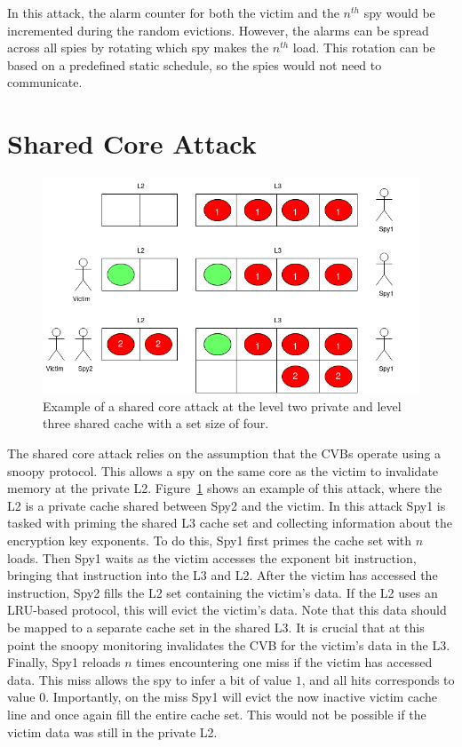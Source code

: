 \documentclass[12pt]{article}
\begin{document}
In this attack, the alarm counter for both the victim and the $n^{th}$ spy would be incremented during the random evictions.
However, the alarms can be spread across all spies by rotating which spy makes the $n^{th}$ load.
This rotation can be based on a predefined static schedule, so the spies would not need to communicate.


\section{Shared Core Attack}

\begin{figure}[h]
\centering
\includegraphics[scale=0.5]{../presentation/snd_atk.png}
\caption{Example of a shared core attack at the level two private and level three shared cache with a set size of four.}
\label{fig:ss}
\end{figure}

The shared core attack relies on the assumption that the CVBs operate using a snoopy protocol.
This allows a spy on the same core as the victim to invalidate memory at the private L2.
Figure~\ref{fig:ss} shows an example of this attack, where the L2 is a private cache shared between Spy2 and the victim.
In this attack Spy1 is tasked with priming the shared L3 cache set and collecting information about the encryption key exponents.
To do this, Spy1 first primes the cache set with $n$ loads.
Then Spy1 waits as the victim accesses the exponent bit instruction, bringing that instruction into the L3 and L2.
After the victim has accessed the instruction, Spy2 fills the L2 set containing the victim's data.
If the L2 uses an LRU-based protocol, this will evict the victim's data.
Note that this data should be mapped to a separate cache set in the shared L3.
It is crucial that at this point the snoopy monitoring invalidates the CVB for the victim's data in the L3.
Finally, Spy1 reloads $n$ times encountering one miss if the victim has accessed data.
This miss allows the spy to infer a bit of value $1$, and all hits corresponds to value $0$.
Importantly, on the miss Spy1 will evict the now inactive victim cache line and once again fill the entire cache set.
This would not be possible if the victim data was still in the private L2.
\end{document}

